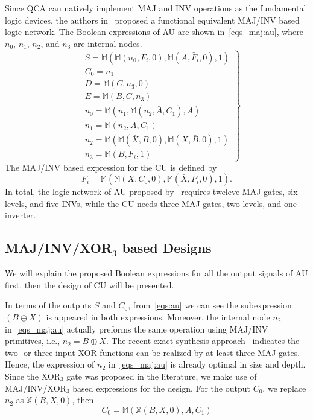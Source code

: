 \documentclass[9pt,journal,compsoc]{IEEEtran}
\begin{document}
Since QCA can natively implement MAJ and INV operations as the fundamental logic devices, the authors in~\cite{2} proposed a functional equivalent MAJ/INV based logic network. The Boolean expressions of AU are shown in~\eqref{eqs_maj:au}, where $n_0$, $n_1$, $n_2$, and $n_3$ are internal nodes.
\begin{equation}~\label{eqs_maj:au}
\left.
\begin{split}
& S = \mathbb{M}(\mathbb{M}(n_0, F_i, 0),\mathbb{M}(A, \bar F_i, 0 ), 1) \\
&C_{0} = n_1 \\
&D = \mathbb{M}(C, n_3, 0)\\    
&E = \mathbb{M}(B, C, n_3)\\
& n_0 = \mathbb{M}( \bar n_1, \mathbb{M}(n_2, \bar A, C_1), A )\\
& n_1 = \mathbb{M}(n_2, A, C_1) \\
& n_2 = \mathbb{M}(\mathbb{M}(\bar X, B, 0), \mathbb{M}(X, \bar B, 0 ), 1) \\
& n_3 = \mathbb{M}(B, F_i, 1)
\end{split}
\right\}
\end{equation}
The MAJ/INV based expression for the CU is defined by
\begin{equation}\label{eq:cu}
F_{i} = \mathbb{M}(\mathbb{M}(X, C_0, 0), \mathbb{M}(\bar X, P_i, 0 ), 1).
\end{equation}
In total, the logic network of AU proposed by~\cite{2} requires tweleve MAJ gates, six levels, and five INVs, while the CU needs three MAJ gates, two levels, and one inverter.

\subsection{MAJ/INV/XOR$_3$ based Designs}
We will explain the proposed Boolean expressions for all the output signals of AU first, then the design of CU will be presented.

In terms of the outputs $S$ and $C_0$, from~\eqref{eqs:au} we can see the
subexpression $(B \oplus X)$ is appeared in both expressions. Moreover, the internal node $n_2$ in~\eqref{eqs_maj:au} actually preforms the same operation using MAJ/INV primitives, i.e., $n_2 = B \oplus X$.
The recent exact synthesis approach~\cite{soeken2017exact} indicates the two- or three-input XOR functions can be realized by at least three MAJ gates. Hence, the expression of $n_2$ in~\eqref{eqs_maj:au} is already optimal in size and depth.
Since the XOR$_3$ gate was proposed in the literature, we make use of MAJ/INV/XOR$_3$ based expressions for the design.
For the output $C_0$, we replace $n_2$ as $\mathbb{X}(B, X, 0)$, then
\begin{equation}\label{ex_C0}
C_{0} = \mathbb{M}(\mathbb{X}(B, X, 0), A, C_{1})
\end{equation}
\end{document}
